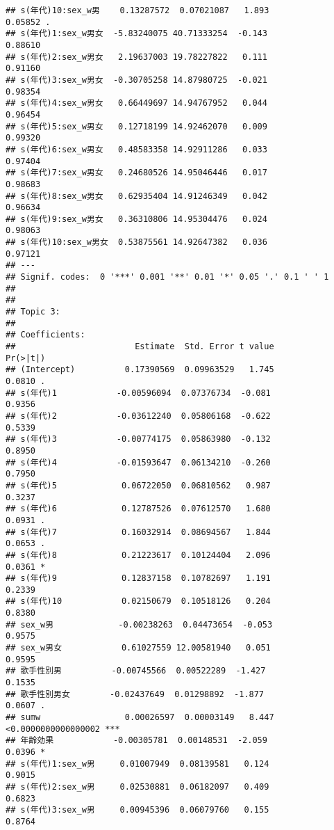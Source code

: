 \documentclass[
]{article}
\begin{document}
\begin{verbatim}
## s(年代)10:sex_w男    0.13287572  0.07021087   1.893              0.05852 .  
## s(年代)1:sex_w男女  -5.83240075 40.71333254  -0.143              0.88610    
## s(年代)2:sex_w男女   2.19637003 19.78227822   0.111              0.91160    
## s(年代)3:sex_w男女  -0.30705258 14.87980725  -0.021              0.98354    
## s(年代)4:sex_w男女   0.66449697 14.94767952   0.044              0.96454    
## s(年代)5:sex_w男女   0.12718199 14.92462070   0.009              0.99320    
## s(年代)6:sex_w男女   0.48583358 14.92911286   0.033              0.97404    
## s(年代)7:sex_w男女   0.24680526 14.95046446   0.017              0.98683    
## s(年代)8:sex_w男女   0.62935404 14.91246349   0.042              0.96634    
## s(年代)9:sex_w男女   0.36310806 14.95304476   0.024              0.98063    
## s(年代)10:sex_w男女  0.53875561 14.92647382   0.036              0.97121    
## ---
## Signif. codes:  0 '***' 0.001 '**' 0.01 '*' 0.05 '.' 0.1 ' ' 1
## 
## 
## Topic 3:
## 
## Coefficients:
##                        Estimate  Std. Error t value            Pr(>|t|)    
## (Intercept)          0.17390569  0.09963529   1.745              0.0810 .  
## s(年代)1            -0.00596094  0.07376734  -0.081              0.9356    
## s(年代)2            -0.03612240  0.05806168  -0.622              0.5339    
## s(年代)3            -0.00774175  0.05863980  -0.132              0.8950    
## s(年代)4            -0.01593647  0.06134210  -0.260              0.7950    
## s(年代)5             0.06722050  0.06810562   0.987              0.3237    
## s(年代)6             0.12787526  0.07612570   1.680              0.0931 .  
## s(年代)7             0.16032914  0.08694567   1.844              0.0653 .  
## s(年代)8             0.21223617  0.10124404   2.096              0.0361 *  
## s(年代)9             0.12837158  0.10782697   1.191              0.2339    
## s(年代)10            0.02150679  0.10518126   0.204              0.8380    
## sex_w男             -0.00238263  0.04473654  -0.053              0.9575    
## sex_w男女            0.61027559 12.00581940   0.051              0.9595    
## 歌手性別男          -0.00745566  0.00522289  -1.427              0.1535    
## 歌手性別男女        -0.02437649  0.01298892  -1.877              0.0607 .  
## sumw                 0.00026597  0.00003149   8.447 <0.0000000000000002 ***
## 年齢効果            -0.00305781  0.00148531  -2.059              0.0396 *  
## s(年代)1:sex_w男     0.01007949  0.08139581   0.124              0.9015    
## s(年代)2:sex_w男     0.02530881  0.06182097   0.409              0.6823    
## s(年代)3:sex_w男     0.00945396  0.06079760   0.155              0.8764    

\end{verbatim}
\end{document}
